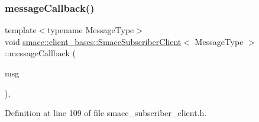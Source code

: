 \mbox{\label{classsmacc_1_1client__bases_1_1SmaccSubscriberClient_acf85b80439aff5cf2bfa0649e9e45654}} 
\subsubsection{\texorpdfstring{message\+Callback()}{messageCallback()}}
{\footnotesize\ttfamily template$<$typename Message\+Type$>$ \\
void \hyperlink{classsmacc_1_1client__bases_1_1SmaccSubscriberClient}{smacc\+::client\+\_\+bases\+::\+Smacc\+Subscriber\+Client}$<$ Message\+Type $>$\+::message\+Callback (\begin{DoxyParamCaption}\item[{const Message\+Type \&}]{msg }\end{DoxyParamCaption})\hspace{0.3cm}{\ttfamily [inline]}, {\ttfamily [private]}}



Definition at line 109 of file smacc\+\_\+subscriber\+\_\+client.\+h.


